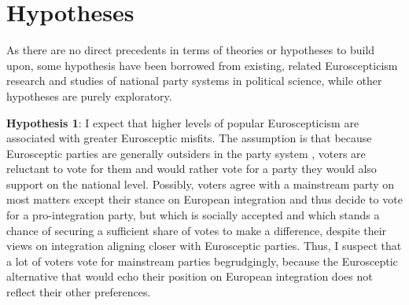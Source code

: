 \section{Hypotheses}
As there are no direct precedents in terms of theories or hypotheses to build upon, some hypothesis have been borrowed from existing, related Euroscepticism research and studies of national party systems in political science, while other hypotheses are purely exploratory.

\textbf{Hypothesis 1}: I expect that higher levels of popular Euroscepticism are associated with greater Eurosceptic misfits. The assumption is that because Eurosceptic parties are generally outsiders in the party system \cite{Ray2007}, voters are reluctant to vote for them and would rather vote for a party they would also support on the national level. Possibly, voters agree with a mainstream party on most matters except their stance on European integration and thus decide to vote for a pro-integration party, but which is socially accepted and which stands a chance of securing a sufficient share of votes to make a difference, despite their views on integration aligning closer with Eurosceptic parties. Thus, I suspect that a lot of voters vote for mainstream parties begrudgingly, because the Eurosceptic alternative that would echo their position on European integration does not reflect their other preferences.

